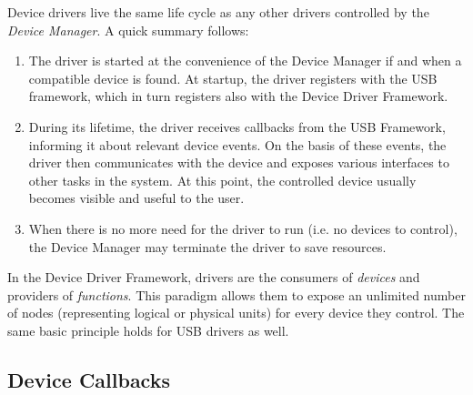 Device drivers live the same life cycle as any other drivers controlled by the
\textit{Device Manager}. A quick summary follows:
~
\begin{enumerate}
	\item The driver is started at the convenience of the Device Manager if and
	when a compatible device is found. At startup, the driver registers with the
	USB framework, which in turn registers also with the Device Driver
	Framework.

	\item During its lifetime, the driver receives callbacks from the USB
	Framework, informing it about relevant device events. On the basis of these
	events, the driver then communicates with the device and exposes various
	interfaces to other tasks in the system. At this point, the controlled
	device usually becomes visible and useful to the user.

	\item When there is no more need for the driver to run (i.e. no devices to
	control), the Device Manager may terminate the driver to save resources.
\end{enumerate}

In the Device Driver Framework, drivers are the consumers of \textit{devices}
and providers of \textit{functions}. This paradigm allows them to expose an
unlimited number of nodes (representing logical or physical units) for every
device they control. The same basic principle holds for USB drivers as well.


\subsection{Device Callbacks}

